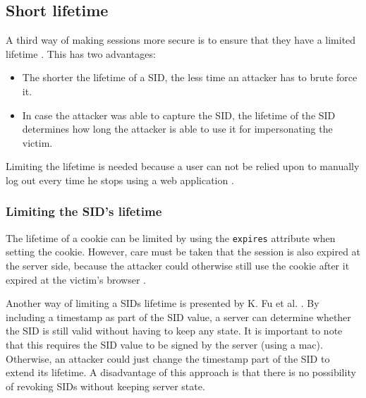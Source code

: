 \subsection{Short lifetime}
A third way of making sessions more secure is to ensure that they have a limited lifetime \cite{Fu2001}. This has two advantages:
\begin{itemize}
	\item The shorter the lifetime of a SID, the less time an attacker has to brute force it.
	\item In case the attacker was able to capture the SID, the lifetime of the SID determines how long the attacker is able to use it for impersonating the victim.
\end{itemize}

Limiting the lifetime is needed because a user can not be relied upon to manually log out every time he stops using a web application \cite{OWASP2009a}. %

\subsubsection{Limiting the SID's lifetime}
The lifetime of a cookie can be limited by using the \texttt{expires} attribute when setting the cookie. However, care must be taken that the session is also expired at the server side, because the attacker could otherwise still use the cookie after it expired at the victim's browser \cite{Kolsek2002}.

Another way of limiting a SIDs lifetime is presented by K. Fu et al. \cite{Fu2001}. By including a timestamp as part of the SID value, a server can determine whether the SID is still valid without having to keep any state. It is important to note that this requires the SID value to be signed by the server (using a \gls{mac}). Otherwise, an attacker could just change the timestamp part of the SID to extend its lifetime. A disadvantage of this approach is that there is no possibility of revoking SIDs without keeping server state.

